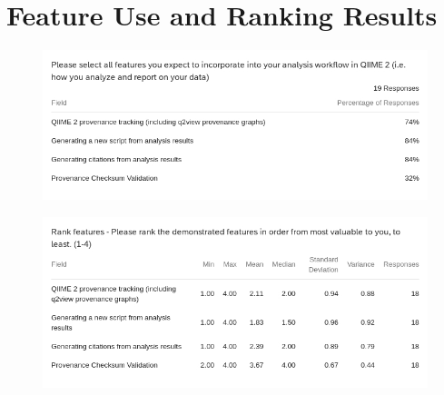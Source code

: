 \chapter{Feature Use and Ranking Results}
\label{app:featureUse}

\begin{figure}[htp]
\centering
\includegraphics[width=\textwidth]{figures/feature_use.jpg}
\end{figure}

\begin{figure}[htp]
\centering
\includegraphics[width=\textwidth]{figures/feature_ranking.jpg}
\end{figure}